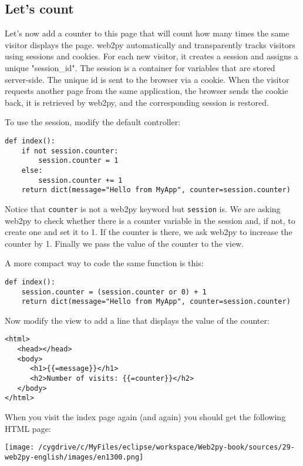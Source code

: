 \documentclass[justified,sixbynine,notoc]{tufte-book}
\def\ft{\small\tt}
\def\inxx#1{\index{#1}}
\begin{document}
\begin{fullwidth}
\goodbreak\subsection{Let's count}

\inxx{session}
Let's now add a counter to this page that will count how many times the same visitor displays the page.
\noindent web2py automatically and transparently tracks visitors using sessions and cookies. For each new visitor, it creates a session and assigns a unique "session\_id". The session is a container for variables that are stored server-side. The unique id is sent to the browser via a cookie. When the visitor requests another page from the same application, the browser sends the cookie back, it is retrieved by web2py, and the corresponding session is restored.

To use the session, modify the default controller:
\begin{lstlisting}
def index():
    if not session.counter:
        session.counter = 1
    else:
        session.counter += 1
    return dict(message="Hello from MyApp", counter=session.counter)
\end{lstlisting}

Notice that {\ft counter} is not a web2py keyword but {\ft session} is. We are asking web2py to check whether there is a counter variable in the session and, if not, to create one and set it to 1. If the counter is there, we ask web2py to increase the counter by 1. Finally we pass the value of the counter to the view.

A more compact way to code the same function is this:
\begin{lstlisting}
def index():
    session.counter = (session.counter or 0) + 1
    return dict(message="Hello from MyApp", counter=session.counter)
\end{lstlisting}

Now modify the view to add a line that displays the value of the counter:
\begin{lstlisting}[keywords={}]
<html>
   <head></head>
   <body>
      <h1>{{=message}}</h1>
      <h2>Number of visits: {{=counter}}</h2>
   </body>
</html>
\end{lstlisting}

When you visit the index page again (and again) you should get the following HTML page:


\goodbreak\begin{center}\texttt{[image: /cygdrive/c/MyFiles/eclipse/workspace/Web2py-book/sources/29-web2py-english/images/en1300.png]}\end{center}



\end{fullwidth}
\end{document}
